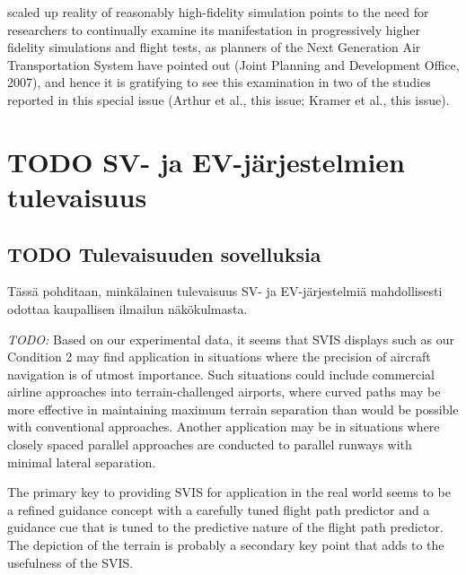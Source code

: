 \documentclass[utf8,bachelor,manualbib]{gradu3}
\begin{document}
scaled up reality of reasonably high-fidelity simulation points to the need for researchers
to continually examine its manifestation in progressively higher fidelity
simulations and flight tests, as planners of the Next Generation Air Transportation
System have pointed out (Joint Planning and Development Office, 2007), and
hence it is gratifying to see this examination in two of the studies reported in this
special issue (Arthur et al., this issue; Kramer et al., this issue). \citep{wickens2009}


























\chapter{TODO SV- ja EV-järjestelmien tulevaisuus}

\section{TODO Tulevaisuuden sovelluksia}

Tässä pohditaan, minkälainen tulevaisuus SV- ja EV-järjestelmiä mahdollisesti odottaa kaupallisen ilmailun näkökulmasta.

\emph{TODO:}
Based on our experimental data, it seems that SVIS displays such as our Condition
2 may find application in situations where the precision of aircraft navigation is of
utmost importance. Such situations could include commercial airline approaches
into terrain-challenged airports, where curved paths may be more effective in
maintaining maximum terrain separation than would be possible with conventional
approaches. Another application may be in situations where closely spaced
parallel approaches are conducted to parallel runways with minimal lateral separation. \citep{schnellym2004}

The primary key to
providing SVIS for application in the real world seems to be a refined guidance
concept with a carefully tuned flight path predictor and a guidance cue that is tuned
to the predictive nature of the flight path predictor. The depiction of the terrain is
probably a secondary key point that adds to the usefulness of the SVIS. \citep{schnellym2004}
\end{document}
